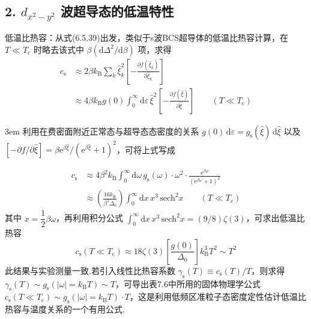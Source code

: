 \subsection*{2. $d_{x^{2}-y^{2}}$ 波超导态的低温特性}

低温比热容：从式(6.5.39)出发，类似于s波BCS超导体的低温比热容计算，在 $T\ll T_{\mathrm{c}}$ 时略去该式中 $\beta\left(\mathrm{d}\Delta^{2}/\mathrm{d}\beta\right)$ 项，求得
\begin{equation}
\begin{aligned}
  c_{\mathrm{s}}&\approx2\beta k_{\mathrm{B}}\sum_{k}\hat{\xi}_{k}^{2}
  \left[-\frac{\partial f\left(\hat{\xi}_{k}\right)}{\partial\hat{\xi}_{k}}\right]\\
  &\approx4\beta k_{\mathrm{B}}g(0)\int_{0}^{\infty}\mathrm{d}\varepsilon\,\hat{\xi}^{2}
  \left[-\frac{\partial f(\hat{\xi})}{\partial\hat{\xi}}\right]
  \qquad\left(T\ll T_{\mathrm{c}}\right)
\end{aligned}
\end{equation}
{\emergencystretch 3em
利用在费密面附近正常态与超导态态密度的关系 $g(0)\,\mathrm{d}\varepsilon=\allowbreak g_{\mathrm{s}}(\hat{\xi})\,\mathrm{d}\hat{\xi}$ 以及 $\left[-\partial f/\partial\hat{\xi}\right]=\allowbreak\beta\mathrm{e}^{\beta\hat{\xi}}/\left(\mathrm{e}^{\beta\hat{\xi}}+1\right)^{2}$，可将上式写成\par}
\begin{equation}
\begin{aligned}
  c_{\mathrm{s}}&\approx4\beta^{2}k_{\mathrm{B}}\int_{0}^{\infty}\mathrm{d}\omega\,g_{\mathrm{s}}(\omega)\cdot\omega^{2}\cdot
  \frac{\mathrm{e}^{\beta\omega}}{\left(\mathrm{e}^{\beta\omega}+1\right)^{2}}\\
  &\approx\left(\frac{16k_{\mathrm{B}}}{\beta^{2}\Delta_{0}}\right)\int_{0}^{\infty}\mathrm{d}x\,x^{3}\,\mathrm{sech}^{2}x
  \qquad\left(T\ll T_{\mathrm{c}}\right)
\end{aligned}
\end{equation}
其中 $x=\dfrac{1}{2}\beta\omega$，再利用积分公式 $\int_{0}^{\infty}\mathrm{d}x\,x^{3}\,\mathrm{sech}^{2}x=\left(9/8\right)\zeta(3)$，可求出低温比热容
\begin{equation}
  c_{\mathrm{s}}\left(T\ll T_{\mathrm{c}}\right)\approx18\zeta(3)\left[\frac{g(0)}{\Delta_{0}}\right]k_{\mathrm{B}}^{3}T^{2}\sim T^{2}
\end{equation}
此结果与实验测量一致.若引入线性比热容系数 $\gamma_{\mathrm{s}}(T)\equiv c_{\mathrm{s}}(T)/T$，则求得 $\gamma_{\mathrm{s}}(T)\sim g_{\mathrm{s}}\left(\left|\omega\right|=k_{\mathrm{B}}T\right)\sim T$，可导出表7.6中所用的固体物理学公式 $c_{\mathrm{s}}\left(T\ll T_{\mathrm{c}}\right)\sim g_{\mathrm{s}}\left(\left|\omega\right|=k_{\mathrm{B}}T\right)\cdot T$，这是利用低频区准粒子态密度定性估计低温比热容与温度关系的一个有用公式.


